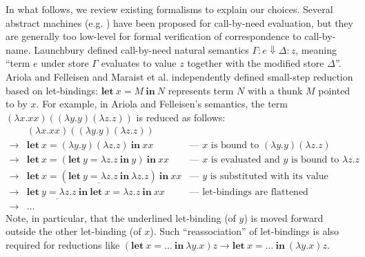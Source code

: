\documentclass{llncs}
\newcommand{\LET}[3]{\mathbf{let}~#1=#2~\mathbf{in}~#3}
\newcommand{\LETBINDING}[2]{\mathbf{let}~#1=#2~\mathbf{in}}
\begin{document}
In what follows, we review existing formalisms to explain our choices.  Several abstract machines (e.g. \cite{Johnsson84,PeytonJones92,Fairbairn87}) have been proposed for call-by-need evaluation, but they are generally too low-level for formal verification of correspondence to call-by-name.  Launchbury \cite{Launchbury93} defined call-by-need natural semantics $\Gamma : e \Downarrow \Delta : z$, meaning ``term $e$ under store $\Gamma$ evaluates to value $z$ together with the modified store $\Delta$''.
Ariola and Felleisen \cite{Ariola97} and Maraist et al. \cite{Maraist98} independently defined small-step reduction based on let-bindings: $\LET{x}{M}{N}$ represents term $N$ with a thunk $M$ pointed to by $x$.
For example, in Ariola and Felleisen's semantics, the term
$(\lambda x.xx)((\lambda y.y)(\lambda z.z))$
is reduced as follows:
\[ \begin{array}{lll}
	& (\lambda x.xx)((\lambda y.y)(\lambda z.z)) & \\
	\rightarrow & \LET{x}{(\lambda y.y)(\lambda z.z)}{xx} & \mbox{--- $x$ is bound to $(\lambda y.y)(\lambda z.z)$} \\
	\rightarrow & \LET{x}{(\LET{y}{\lambda z.z}{y})}{xx} & \mbox{--- $x$ is evaluated and $y$ is bound to $\lambda z.z$} \\
	\rightarrow & \LET{x}{(\underline{\LETBINDING{y}{\lambda z.z}}~\lambda z.z)}{xx} & \mbox{--- $y$ is substituted with its value} \\
	\rightarrow & \underline{\LETBINDING{y}{\lambda z.z}}~\LET{x}{\lambda z.z}{xx} & \mbox{--- let-bindings are flattened} \\
	\rightarrow & \dots
\end{array} \]
Note, in particular, that the underlined let-binding (of $y$) is moved forward outside the other let-binding (of $x$).  Such ``reassociation'' of let-bindings is also required for reductions like $(\LET{x}{\dots}{\lambda y.x})z \rightarrow \LET{x}{\dots}{(\lambda y.x)z}$.
\end{document}

